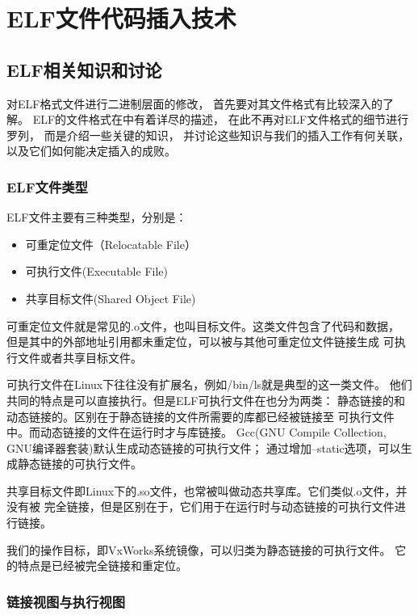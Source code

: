\chapter{ELF文件代码插入技术}

\section{ELF相关知识和讨论}

对ELF格式文件进行二进制层面的修改，
首先要对其文件格式有比较深入的了解。
ELF的文件格式在\cite{elf1.2}中有着详尽的描述，
在此不再对ELF文件格式的细节进行罗列，
而是介绍一些关键的知识，
并讨论这些知识与我们的插入工作有何关联，
以及它们如何能决定插入的成败。

\subsection{ELF文件类型}

ELF文件主要有三种类型，分别是：

\begin{itemize}
 \item 可重定位文件（Relocatable File）
 \item 可执行文件(Executable File)
 \item 共享目标文件(Shared Object File)
\end{itemize}

可重定位文件就是常见的.o文件，也叫目标文件。这类文件包含了代码和数据，
但是其中的外部地址引用都未重定位，可以被与其他可重定位文件链接生成
可执行文件或者共享目标文件。

可执行文件在Linux下往往没有扩展名，例如/bin/ls就是典型的这一类文件。
他们共同的特点是可以直接执行。但是ELF可执行文件在也分为两类：
静态链接的和动态链接的。区别在于静态链接的文件所需要的库都已经被链接至
可执行文件中。而动态链接的文件在运行时才与库链接。
Gcc(GNU Compile Collection, GNU编译器套装)默认生成动态链接的可执行文件；
通过增加--static选项，可以生成静态链接的可执行文件。

共享目标文件即Linux下的.so文件，也常被叫做动态共享库。它们类似.o文件，并没有被
完全链接，但是区别在于，它们用于在运行时与动态链接的可执行文件进行链接。

我们的操作目标，即VxWorks系统镜像，可以归类为静态链接的可执行文件。
它的特点是已经被完全链接和重定位。

\subsection{链接视图与执行视图}

